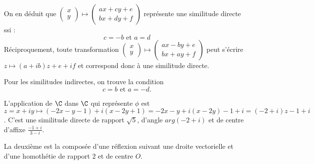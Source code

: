 {{On en déduit que $\begin{pmatrix}x\\y\end{pmatrix} \mapsto  \begin{pmatrix}ax+cy+e\\ bx+dy+f\end{pmatrix}$ représente une similitude directe ssi :
\[ c=-b \text{ et } a=d\]
Réciproquement, toute transformation
$\begin{pmatrix}x\\y\end{pmatrix} \mapsto  \begin{pmatrix}ax-by+e\\ bx+ay+f\end{pmatrix}$ peut s'écrire $z\mapsto (a+ib)z+e+if$ et correspond donc à une similitude directe.


Pour les similitudes indirectes, on trouve la condition \[ c=b \text{ et } a=-d.\]

L'application de $\C$ dans $\C$ qui représente $\phi$ est
$z=x+iy \mapsto (-2x-y-1)+i(x-2y+1) = -2x-y + i(x-2y)-1+i = (-2+i)z-1+i$.  C'est une similitude directe de rapport $\sqrt 5$, d'angle $arg(-2+i)$ et de centre d'affixe $\frac{-1+i}{3-i}$.

La deuxième est la composée d'une réflexion suivant une droite vectorielle et d'une homothétie de rapport $2$ et de centre $O$.
}
}
